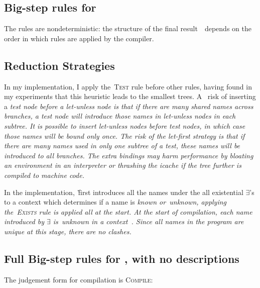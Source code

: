 \documentclass[manuscript,screen, 12pt, nonacm]{acmart}
\begin{document}
      \subsection{Big-step rules for \Compile}
      \compiler

      The rules are nondeterministic: the structure of the final result~\expr\ depends
on the order in which rules are applied by the compiler.  

      \subsection{Reduction Strategies}

      In my implementation, I apply the~\textsc{Test} rule before other rules,
      having found in my experiments that this heuristic leads to the smallest trees. A~%
      risk of inserting a \it{test} node before a \it{let-unless} node is that
      if there are many shared names across branches, a \it{test} node
      will introduce those names in \it{let-unless} nodes in each
      subtree.
      It is possible to insert \it{let-unless} nodes before \it{test}
      nodes, in which case those names will be bound
      only once.  The risk of the \it{let}-first strategy
      is that if there are many names used in only one subtree of a \it{test},
      these names will be introduced to \it{all} branches.  The extra
      bindings may harm
      performance by bloating an environment in an interpreter or thrashing the
      icache if the tree further is compiled to machine code. 

      In the implementation,~\DTran\~first introduces all the names under the
      all existential $\exists$'s to a context which determines if a name is
      \it{known} or~\it{unknown}, applying the~\textsc{Exists} rule is applied
      all at the start. At the start of compilation, each name introduced by
      $\exists$ is~\it{unknown} in a context~\ctx. Since all names in the
      program are unique at this stage, there are no clashes. 

      \subsection{Full Big-step rules for \Compile, with no descriptions}

        The judgement form for compilation is \textsc{Compile}: 

\end{document}
